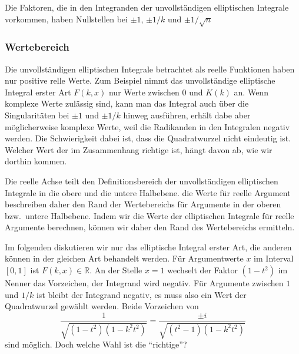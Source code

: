 Die Faktoren, die in den Integranden der unvollständigen elliptischen
Integrale vorkommen, haben Nullstellen bei $\pm1$, $\pm1/k$ und
$\pm 1/\sqrt{n}$


%
%
\subsubsection{Wertebereich}
\label{buch:elliptische:subsubsection:wertebereich}
Die unvollständigen elliptischen Integrale betrachtet als reelle Funktionen
haben nur positive relle Werte.
Zum Beispiel nimmt das unvollständige elliptische Integral erster Art
$F(k,x)$ nur Werte zwischen $0$ und $K(k)$ an.
Wenn komplexe Werte zulässig sind, kann man das Integral auch über die 
Singularitäten bei $\pm 1$ und $\pm 1/k$ hinweg ausführen, erhält
dabe aber möglicherweise komplexe Werte, weil die Radikanden in den
Integralen negativ werden.
Die Schwierigkeit dabei ist, dass die Quadratwurzel nicht eindeutig ist.
Welcher Wert der im Zusammenhang richtige ist, hängt davon ab, wie wir
dorthin kommen.

Die reelle Achse teilt den Definitionsbereich der unvollständigen
elliptischen Integrale in die obere und die untere Halbebene.
die Werte für reelle Argument beschreiben daher den Rand der Wertebereichs
für Argumente in der oberen bzw.~untere Halbebene.
Indem wir die Werte der elliptischen Integrale für reelle Argumente
berechnen, können wir daher den Rand des Wertebereichs ermitteln.

Im folgenden diskutieren wir nur das elliptische Integral erster Art,
die anderen können in der gleichen Art behandelt werden.
Für Argumentwerte $x$ im Interval $[0,1]$ ist $F(k,x)\in\mathbb{R}$.
An der Stelle $x=1$ wechselt der Faktor $(1-t^2)$ im Nenner das
Vorzeichen, der Integrand wird negativ.
Für Argumente zwischen $1$ und $1/k$ ist bleibt der Integrand negativ,
es muss also ein Wert der Quadratwurzel gewählt werden.
Beide Vorzeichen von
\begin{equation}
\frac{1}{\sqrt{(1-t^2)(1-k^2t^2)}}
=
\frac{\pm i}{\sqrt{(t^2-1)(1-k^2t^2)}}
\label{buch:elliptisch:eqn:imaginaerintegrand}
\end{equation}
sind möglich.
Doch welche Wahl ist die ``richtige''?


